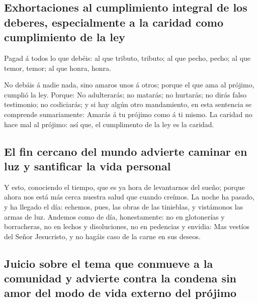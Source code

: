 \hypertarget{exhortaciones-al-cumplimiento-integral-de-los-deberes-especialmente-a-la-caridad-como-cumplimiento-de-la-ley}{%
\subsection{Exhortaciones al cumplimiento integral de los deberes,
especialmente a la caridad como cumplimiento de la
ley}\label{exhortaciones-al-cumplimiento-integral-de-los-deberes-especialmente-a-la-caridad-como-cumplimiento-de-la-ley}}

 Pagad á todos lo que debéis: al que tributo, tributo; al
que pecho, pecho; al que temor, temor; al que honra, honra.

 No debáis á nadie nada, sino amaros unos á otros; porque
el que ama al prójimo, cumplió la ley.  Porque: No
adulterarás; no matarás; no hurtarás; no dirás falso testimonio; no
codiciarás; y si hay algún otro mandamiento, en esta sentencia se
comprende sumariamente: Amarás á tu prójimo como á ti mismo.
 La caridad no hace mal al prójimo: así que, el
cumplimento de la ley es la caridad.

\hypertarget{el-fin-cercano-del-mundo-advierte-caminar-en-luz-y-santificar-la-vida-personal}{%
\subsection{El fin cercano del mundo advierte caminar en luz y
santificar la vida
personal}\label{el-fin-cercano-del-mundo-advierte-caminar-en-luz-y-santificar-la-vida-personal}}

 Y esto, conociendo el tiempo, que es ya hora de
levantarnos del sueño; porque ahora nos está más cerca nuestra salud que
cuando creímos.  La noche ha pasado, y ha llegado el día:
echemos, pues, las obras de las tinieblas, y vistámonos las armas de
luz.  Andemos como de día, honestamente: no en
glotonerías y borracheras, no en lechos y disoluciones, no en pedencias
y envidia:  Mas vestíos del Señor Jesucristo, y no hagáis
caso de la carne en sus deseos.

\hypertarget{juicio-sobre-el-tema-que-conmueve-a-la-comunidad-y-advierte-contra-la-condena-sin-amor-del-modo-de-vida-externo-del-pruxf3jimo}{%
\subsection{Juicio sobre el tema que conmueve a la comunidad y advierte
contra la condena sin amor del modo de vida externo del
prójimo}\label{juicio-sobre-el-tema-que-conmueve-a-la-comunidad-y-advierte-contra-la-condena-sin-amor-del-modo-de-vida-externo-del-pruxf3jimo}}

